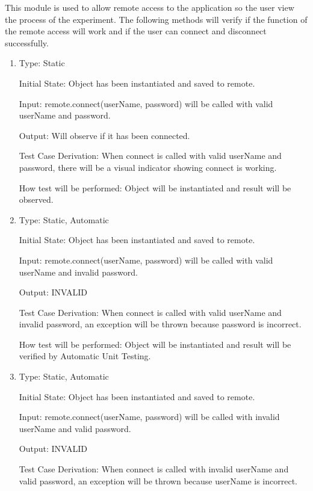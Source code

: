\documentclass[12pt, titlepage]{article}
\begin{document}
This module is used to allow remote access to the application so the user view the process of the experiment. The following methods will verify if the function of the remote 
access will work and if the user can connect and disconnect successfully.
\begin{enumerate}[{UT-RA}1.]

  \item

  Type: Static
            
  Initial State: Object has been instantiated and saved to remote.
            
  Input: remote.connect(userName, password) will be called with valid userName and password.
            
  Output: Will observe if it has been connected.
  
  Test Case Derivation: When connect is called with valid userName and password, there will be a visual indicator showing connect is working.
  
  
  How test will be performed: Object will be instantiated and result will be observed.

  \item

  Type: Static, Automatic
            
  Initial State: Object has been instantiated and saved to remote.
            
  Input: remote.connect(userName, password) will be called with valid userName and  invalid password.
            
  Output: INVALID
  
  Test Case Derivation: When connect is called with valid userName and invalid password, an exception will be thrown because password is incorrect.
  
  
  How test will be performed: Object will be instantiated and result will be verified by Automatic Unit Testing.

  \item

  Type: Static, Automatic
            
  Initial State: Object has been instantiated and saved to remote.
            
  Input: remote.connect(userName, password) will be called with invalid userName and  valid password.
            
  Output: INVALID
  
  Test Case Derivation: When connect is called with invalid userName and valid password, an exception will be thrown because userName is incorrect.
  

\end{enumerate}
\end{document}
